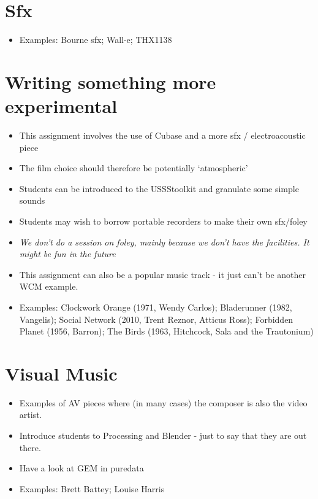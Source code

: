 \section{Sfx}
\begin{itemize}
\item Examples: Bourne sfx; Wall-e; THX1138

\end{itemize}

\section{Writing something more experimental}
\begin{itemize}
\item This assignment involves the use of Cubase and a more sfx / electroacoustic piece
\item The film choice should therefore be potentially `atmospheric'
\item Students can be introduced to the USSStoolkit and granulate some simple sounds
\item Students may wish to borrow portable recorders to make their own sfx/foley
\item \textit{We don't do a session on foley, mainly because we don't have the facilities. It might be fun in the future}
\item This assignment can also be a popular music track - it just can't be another WCM example. 
\item Examples: Clockwork Orange (1971, Wendy Carlos); Bladerunner (1982, Vangelis); Social Network (2010, Trent Reznor, Atticus Ross); Forbidden Planet (1956, Barron); The Birds (1963, Hitchcock, Sala and the Trautonium)
\end{itemize}

\section{Visual Music}
\begin{itemize}
\item Examples of AV pieces where (in many cases) the composer is also the video artist. 
\item Introduce students to Processing and Blender - just to say that they are out there. 
\item Have a look at GEM in puredata 
\item Examples: Brett Battey; Louise Harris
\end{itemize}

